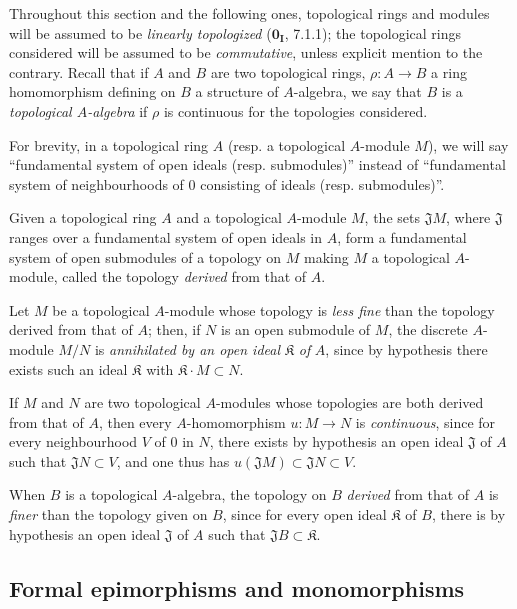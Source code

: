 \begin{env}[19.0.3]
\label{0.19.0.3}
Throughout this section and the following ones, topological rings and modules will be assumed to be \emph{linearly topologized} ($\mathbf{0_I}$, 7.1.1);
the topological rings considered will be assumed to be \emph{commutative}, unless explicit mention to the contrary.
Recall that if $A$ and $B$ are two topological rings, $\rho:A\to B$ a ring homomorphism defining on $B$ a structure of $A$-algebra, we say that $B$ is a \emph{topological $A$-algebra} if $\rho$ is continuous for the topologies considered.

For brevity, in a topological ring $A$ (resp. a topological $A$-module $M$), we will say ``fundamental system of open ideals (resp. submodules)'' instead of ``fundamental system of neighbourhoods of $0$ consisting of ideals (resp. submodules)''.

Given a topological ring $A$ and a topological $A$-module $M$, the sets $\mathfrak{J}M$, where $\mathfrak{J}$ ranges over a fundamental system of open ideals in $A$, form a fundamental system of open submodules of a topology on $M$ making $M$ a topological $A$-module, called the topology \emph{derived} from that of $A$.

Let $M$ be a topological $A$-module whose topology is \emph{less fine} than the topology derived from that of $A$;
then, if $N$ is an open submodule of $M$, the discrete $A$-module $M/N$ is \emph{annihilated by an open ideal} $\mathfrak K$ \emph{of} $A$, since by hypothesis there exists such an ideal $\mathfrak K$ with $\mathfrak K\cdot M\subset N$.


If $M$ and $N$ are two topological $A$-modules whose topologies are both derived from that of $A$, then every $A$-homomorphism $u:M\to N$ is \emph{continuous}, since for every neighbourhood $V$ of $0$ in $N$, there exists by hypothesis an open ideal $\mathfrak{J}$ of $A$ such that $\mathfrak{J}N\subset V$, and one thus has $u(\mathfrak{J}M)\subset\mathfrak{J}N\subset V$.

When $B$ is a topological $A$-algebra, the topology on $B$ \emph{derived} from that of $A$ is \emph{finer} than the topology given on $B$, since for every open ideal $\mathfrak K$ of $B$, there is by hypothesis an open ideal $\mathfrak{J}$ of $A$ such that $\mathfrak{J}B\subset\mathfrak K$.
\end{env}

\subsection{Formal epimorphisms and monomorphisms}
\label{subsection:0.19.1}


